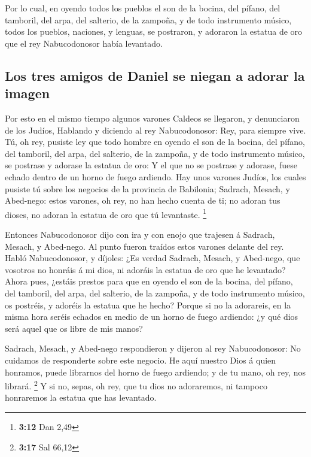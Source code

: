  Por lo cual, en oyendo todos los pueblos el son de la
bocina, del pífano, del tamboril, del arpa, del salterio, de la zampoña,
y de todo instrumento músico, todos los pueblos, naciones, y lenguas, se
postraron, y adoraron la estatua de oro que el rey Nabucodonosor había
levantado.

\hypertarget{los-tres-amigos-de-daniel-se-niegan-a-adorar-la-imagen}{%
\subsection{Los tres amigos de Daniel se niegan a adorar la
imagen}\label{los-tres-amigos-de-daniel-se-niegan-a-adorar-la-imagen}}

 Por esto en el mismo tiempo algunos varones Caldeos se
llegaron, y denunciaron de los Judíos,  Hablando y diciendo
al rey Nabucodonosor: Rey, para siempre vive.  Tú, oh rey,
pusiste ley que todo hombre en oyendo el son de la bocina, del pífano,
del tamboril, del arpa, del salterio, de la zampoña, y de todo
instrumento músico, se postrase y adorase la estatua de oro:
 Y el que no se postrase y adorase, fuese echado dentro de
un horno de fuego ardiendo.  Hay unos varones Judíos, los
cuales pusiste tú sobre los negocios de la provincia de Babilonia;
Sadrach, Mesach, y Abed-nego: estos varones, oh rey, no han hecho cuenta
de ti; no adoran tus dioses, no adoran la estatua de oro que tú
levantaste. \footnote{\textbf{3:12} Dan 2,49}

 Entonces Nabucodonosor dijo con ira y con enojo que
trajesen á Sadrach, Mesach, y Abed-nego. Al punto fueron traídos estos
varones delante del rey.  Habló Nabucodonosor, y díjoles:
¿Es verdad Sadrach, Mesach, y Abed-nego, que vosotros no honráis á mi
dios, ni adoráis la estatua de oro que he levantado?  Ahora
pues, ¿estáis prestos para que en oyendo el son de la bocina, del
pífano, del tamboril, del arpa, del salterio, de la zampoña, y de todo
instrumento músico, os postréis, y adoréis la estatua que he hecho?
Porque si no la adorareis, en la misma hora seréis echados en medio de
un horno de fuego ardiendo: ¿y qué dios será aquel que os libre de mis
manos?

 Sadrach, Mesach, y Abed-nego respondieron y dijeron al rey
Nabucodonosor: No cuidamos de responderte sobre este negocio.
 He aquí nuestro Dios á quien honramos, puede librarnos del
horno de fuego ardiendo; y de tu mano, oh rey, nos librará. \footnote{\textbf{3:17}
  Sal 66,12}  Y si no, sepas, oh rey, que tu dios no
adoraremos, ni tampoco honraremos la estatua que has levantado.

